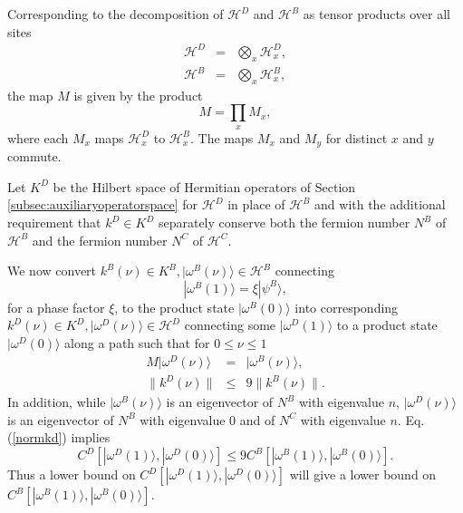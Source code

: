 \documentclass[12pt,amsmath,amssymb,onecolumn]{revtex4-2}
\begin{document}
Corresponding to the decomposition of $\mathcal{H}^D$ and $\mathcal{H}^B$ as tensor
products over all sites
\begin{subequations}
  \begin{eqnarray}
  \label{hdasproduct}
  \mathcal{H}^D &=& \bigotimes_x \mathcal{H}^D_x, \\
  \label{hbasproduct}
  \mathcal{H}^B &=& \bigotimes_x \mathcal{H}^B_x, 
  \end{eqnarray}
\end{subequations}
the map $M$ is given by the product
\begin{equation}
  \label{masproduct}
  M = \prod_x M_x,
\end{equation}
where each $M_x$  maps $\mathcal{H}^D_x$ to $\mathcal{H}^B_x$. The
maps $M_x$ and $M_y$ for distinct $x$ and $y$ commute.



Let $K^D$ be 
the Hilbert  
space of Hermitian operators of Section \ref{subsec:auxiliaryoperatorspace}
for $\mathcal{H}^D$ in place of $\mathcal{H}^B$ and with the additional requirement
that $k^D \in K^D$
separately conserve both the fermion number $N^B$
of $\mathcal{H}^B$ and the fermion number $N^C$ of $\mathcal{H}^C$. 

We now convert $k^B(\nu) \in K^B, |\omega^B(\nu) \rangle  \in \mathcal{H}^B$
connecting
\begin{equation}
  \label{psibomega}
 |\omega^B(1) \rangle  = \xi |\psi^B \rangle ,
\end{equation}
for a phase factor $\xi$, to the product state $|\omega^B(0) \rangle $ into
corresponding $k^D(\nu) \in K^D, |\omega^D(\nu) \rangle  \in \mathcal{H}^D$
connecting some $|\omega^D(1) \rangle $
to a product state $|\omega^D(0) \rangle $
along a path such that for $0 \le \nu \le 1$
\begin{subequations}
  \begin{eqnarray}
  \label{omegaw}
  M |\omega^D(\nu) \rangle  &=& |\omega^B(\nu) \rangle , \\
  \label{normkd}
  \parallel k^D(\nu) \parallel &\le& 9 \parallel k^B(\nu) \parallel.
  \end{eqnarray}
\end{subequations}
In addition, while $|\omega^B(\nu) \rangle $ is an eigenvector
of $N^B$ with eigenvalue $n$, $|\omega^D(\nu) \rangle $ is an eigenvector
of $N^B$ with eigenvalue 0 and of $N^C$ with eigenvalue $n$.
Eq. (\ref{normkd}) implies
\begin{equation}
  \label{complexityd}
  C^D[ |\omega^D(1) \rangle , |\omega^D( 0) \rangle ] \le
  9 C^B[ |\omega^B(1) \rangle , |\omega^B( 0) \rangle ]. 
\end{equation}
Thus a lower bound on $C^D[ |\omega^D(1) \rangle , |\omega^D( 0) \rangle ]$ will give a
lower bound on $C^B[ |\omega^B(1) \rangle , |\omega^B( 0) \rangle ]$.
\end{document}
